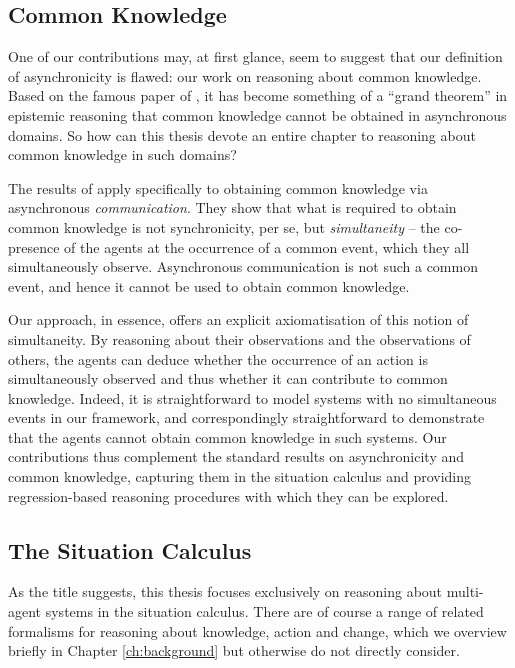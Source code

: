 \subsection{Common Knowledge}

One of our contributions may, at first glance, seem to suggest that
our definition of asynchronicity is flawed: our work on reasoning
about common knowledge. Based on the famous paper of \citet{halpern90knowledge_distrib},
it has become something of a {}``grand theorem'' in epistemic reasoning
that common knowledge cannot be obtained in asynchronous domains.
So how can this thesis devote an entire chapter to reasoning about
common knowledge in such domains?

The results of \citep{halpern90knowledge_distrib} apply specifically
to obtaining common knowledge via asynchronous \emph{communication}.
They show that what is required to obtain common knowledge is not
synchronicity, per se, but \emph{simultaneity} -- the co-presence
of the agents at the occurrence of a common event, which they all
simultaneously observe. Asynchronous communication is not such a common
event, and hence it cannot be used to obtain common knowledge.

Our approach, in essence, offers an explicit axiomatisation of this
notion of simultaneity. By reasoning about their observations and
the observations of others, the agents can deduce whether the occurrence
of an action is simultaneously observed and thus whether it can contribute
to common knowledge. Indeed, it is straightforward to model systems
with no simultaneous events in our framework, and correspondingly
straightforward to demonstrate that the agents cannot obtain common
knowledge in such systems. Our contributions thus complement the standard
results on asynchronicity and common knowledge, capturing them in
the situation calculus and providing regression-based reasoning procedures
with which they can be explored.


\subsection{The Situation Calculus}

As the title suggests, this thesis focuses exclusively on reasoning
about multi-agent systems in the situation calculus. There are of
course a range of related formalisms for reasoning about knowledge,
action and change, which we overview briefly in Chapter \ref{ch:background}
but otherwise do not directly consider.

